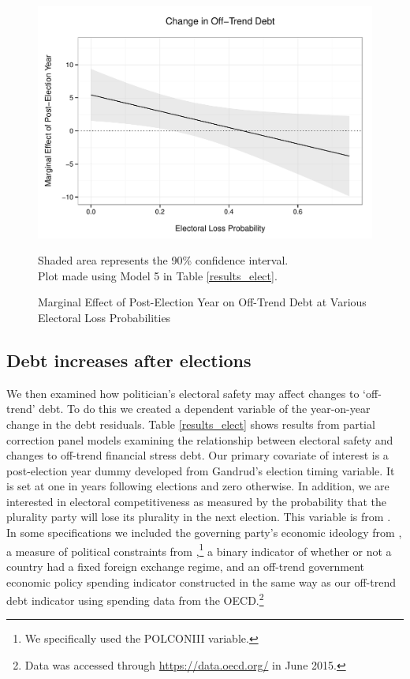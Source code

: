 \documentclass[]{article}
\begin{document}
\begin{figure}
    \caption{Marginal Effect of Post-Election Year on Off-Trend Debt at Various Electoral Loss Probabilities}
    \label{post_loss_me}

    \begin{center}
        \includegraphics[scale=0.55]{figures/post_elect_loss.pdf}
    \end{center}

    {\scriptsize{Shaded area represents the 90\% confidence interval. \\
    Plot made using Model 5 in Table \ref{results_elect}.}}

\end{figure}

\subsection{Debt increases after elections}

We then examined how politician's electoral safety may affect changes to `off-trend' debt. To do this we created a dependent variable of the year-on-year change in the debt residuals. Table \ref{results_elect} shows results from partial correction panel models examining the relationship between electoral safety and changes to off-trend financial stress debt. Our primary covariate of interest is a post-election year dummy developed from Gandrud's \citeyearpar{gandrudYrcurnt} election timing variable. It is set at one in years following elections and zero otherwise. In addition, we are interested in electoral competitiveness as measured by the probability that the plurality party will lose its plurality in the next election. This variable is from \cite{Kayser2015comp}. In some specifications we included the governing party's economic ideology from \citep[][updated through 2012]{DPI2001}, a measure of political constraints from \cite[][updated through 2011]{Henisz2004},\footnote{We specifically used the POLCONIII variable.} a binary indicator of whether or not a country had a fixed foreign exchange regime, and an off-trend government economic policy spending indicator constructed in the same way as our off-trend debt indicator using spending data from the OECD.\footnote{Data was accessed through \url{https://data.oecd.org/} in June 2015.}
\end{document}
